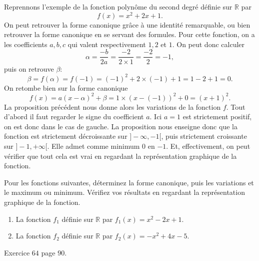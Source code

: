 \documentclass[11pt]{article}
\begin{document}
\begin{exemple}
  Reprennons l'exemple de la fonction polynôme du second degré définie sur
  $\mathbb{R}$ par
  \[
    f(x) = x^2+2x+1.
  \]
  On peut retrouver la forme canonique gr\^ace à une identité remarquable, ou
  bien retrouver la forme canonique en se servant des formules. Pour cette
  fonction, on a les coefficients $a, b, c$ qui valent respectivement $1, 2$ et
  $1$. On peut donc calculer
  \[
    \alpha =\frac{-b}{2a}=\frac{-2}{2\times 1} = \frac{-2}{2} = -1,
  \]
  puis on retrouve $\beta$:
  \[
    \beta = f(\alpha) = f(-1) = (-1)^2+2\times(-1)+1 = 1 - 2 + 1 = 0.
  \]
  On retombe bien sur la forme canonique
  \[
    f(x) = a(x-\alpha)^2+\beta = 1\times(x-(-1))^2+0=(x+1)^2.
  \]
  La proposition précédent nous donne alors les variations de la fonction $f$.
  Tout d'abord il faut regarder le signe du coefficient $a$. Ici $a=1$ est
  strictement positif, on est donc dans le cas de gauche. La proposition nous
enseigne donc que la fonction est strictement décroissante sur $]-\infty, -1[$,
puis strictement croissante sur $]-1, +\infty[$. Elle admet comme minimum $0$
    en $-1$. Et, effectivement, on peut vérifier que tout cela est vrai en
    regardant la représentation graphique de la fonction.
 \begin{center}
\end{center}
\end{exemple}

\begin{exo}
  Pour les fonctions suivantes, déterminez la forme canonique, puis les
  variations et le maximum ou minimum. Vérifiez vos résultats en regardant la
  représentation graphique de la fonction.
  \begin{enumerate}
    \item La fonction $f_1$ définie sur $\mathbb{R}$ par $f_1(x)=x^2-2x+1$.
    \item La fonction $f_2$ définie sur $\mathbb{R}$ par $f_2(x)=-x^2+4x-5$.
  \end{enumerate}
\end{exo}
\begin{exo}
  Exercice $64$ page $90$.
\end{exo}
\end{document}
